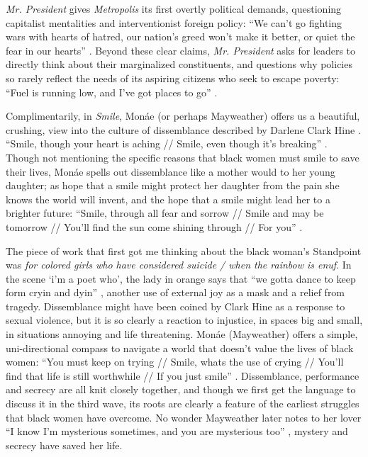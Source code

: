 \documentclass[a4paper, 11pt]{article} %
\begin{document}
\emph{Mr. President} gives \emph{Metropolis} its first overtly political demands, questioning capitalist mentalities and interventionist foreign policy: 
``We can't go fighting wars with hearts of hatred, our nation's greed won't make it better, or quiet the fear in our hearts'' .
Beyond these clear claims, \emph{Mr. President} asks for leaders to directly think about their marginalized constituents, and questions why policies so rarely reflect the needs of its aspiring citizens who seek to escape poverty:
``Fuel is running low, and I've got places to go'' .

Complimentarily, in \emph{Smile}, Mon\'ae (or perhaps Mayweather) offers us a beautiful, crushing, view into the culture of dissemblance described by Darlene Clark Hine .
``Smile, though your heart is aching // Smile, even though it's breaking'' .
Though not mentioning the specific reasons that black women must smile to save their lives, Mon\'ae spells out dissemblance like a mother would to her young daughter; as hope that a smile might protect her daughter from the pain she knows the world will invent, and the hope that a smile might lead her to a brighter future:
``Smile, through all fear and sorrow // Smile and may be tomorrow // You'll find the sun come shining through // For you'' .

The piece of work that first got me thinking about the black woman's Standpoint was \emph{for colored girls who have considered suicide / when the rainbow is enuf}.
In the scene `i'm a poet who', the lady in orange says that ``we gotta dance to keep form cryin and dyin'' , another use of external joy as a mask and a relief from tragedy.
Dissemblance might have been coined by Clark Hine as a response to sexual violence, but it is so clearly a reaction to injustice, in spaces big and small, in situations annoying and life threatening.
Mon\'ae (Mayweather) offers a simple, uni-directional compass to navigate a world that doesn't value the lives of black women:
``You must keep on trying // Smile, whats the use of crying // You'll find that life is still worthwhile // If you just smile'' .
Dissemblance, performance and secrecy are all knit closely together, and though we first get the language to discuss it in the third wave, its roots are clearly a feature of the earliest struggles that black women have overcome.
No wonder Mayweather later notes to her lover ``I know I'm mysterious sometimes, and you are mysterious too'' ,
mystery and secrecy have saved her life.
\end{document}
